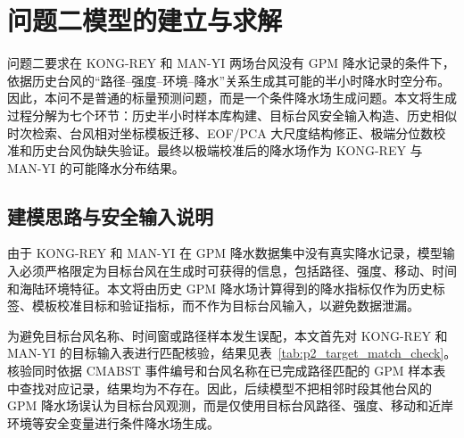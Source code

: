 \documentclass[UTF8,a4paper,zihao=5,fontset=fandol]{ctexart}
\numberwithin{equation}{section}
\numberwithin{figure}{section}
\numberwithin{table}{section}
\begin{document}
\section{问题二模型的建立与求解}

问题二要求在 KONG-REY 和 MAN-YI 两场台风没有 GPM 降水记录的条件下，依据历史台风的“路径--强度--环境--降水”关系生成其可能的半小时降水时空分布。因此，本问不是普通的标量预测问题，而是一个条件降水场生成问题。本文将生成过程分解为七个环节：历史半小时样本库构建、目标台风安全输入构造、历史相似时次检索、台风相对坐标模板迁移、EOF/PCA 大尺度结构修正、极端分位数校准和历史台风伪缺失验证。最终以极端校准后的降水场作为 KONG-REY 与 MAN-YI 的可能降水分布结果。

\subsection{建模思路与安全输入说明}

由于 KONG-REY 和 MAN-YI 在 GPM 降水数据集中没有真实降水记录，模型输入必须严格限定为目标台风在生成时可获得的信息，包括路径、强度、移动、时间和海陆环境特征。本文将由历史 GPM 降水场计算得到的降水指标仅作为历史标签、模板校准目标和验证指标，而不作为目标台风输入，以避免数据泄漏。

为避免目标台风名称、时间窗或路径样本发生误配，本文首先对 KONG-REY 和 MAN-YI 的目标输入表进行匹配核验，结果见表~\ref{tab:p2_target_match_check}。核验同时依据 CMABST 事件编号和台风名称在已完成路径匹配的 GPM 样本表中查找对应记录，结果均为不存在。因此，后续模型不把相邻时段其他台风的 GPM 降水场误认为目标台风观测，而是仅使用目标台风路径、强度、移动和近岸环境等安全变量进行条件降水场生成。

\begin{table}[H]
  \centering
  \caption{KONG-REY 与 MAN-YI 目标台风匹配核验}
  \label{tab:p2_target_match_check}
  \small
\end{table}
\end{document}
